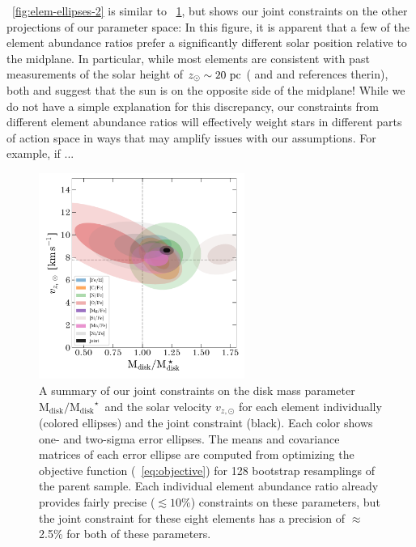 \documentclass[modern]{aastex63}
\newcommand{\mdisk}{\ensuremath{\mathrm{M}_\mathrm{disk}}}
\newcommand{\mratio}{\ensuremath{\mdisk / \mdisk^\star}}
\begin{document}
\figurename~\ref{fig:elem-ellipses-2} is similar to
\figurename~\ref{fig:elem-ellipses-1}, but shows our joint constraints on the
other projections of our parameter space:
In this figure, it is apparent that a few of the element abundance ratios prefer
a significantly different solar position relative to the midplane.
In particular, while most elements are consistent with past measurements of the
solar height of $z_\odot \sim 20~\mathrm{pc}$ (\citealt{Bennett:2019} and
\citealt{Bland-Hawthorn:2016} and references therin), both 
and  suggest that the sun is on the opposite side of the
midplane!
While we do not have a simple explanation for this discrepancy, our constraints
from different element abundance ratios will effectively weight stars in
different parts of action space in ways that may amplify issues with our
assumptions.
For example, if ...


\begin{figure}[!tp]
  \begin{mdframed}[style=figure]
  \begin{center}
  \includegraphics[width=0.6\textwidth]{M-vz-error-ellipses.pdf}
  \end{center}
  \caption{%
    A summary of our joint constraints on the disk mass parameter \mratio\ and
    the solar velocity $v_{z, \odot}$ for each element individually (colored
    ellipses) and the joint constraint (black).
    Each color shows one- and two-sigma error ellipses.
    The means and covariance matrices of each error ellipse are computed from
    optimizing the objective function (\equationname~\ref{eq:objective}) for 128
    bootstrap resamplings of the parent sample.
    Each individual element abundance ratio already provides fairly precise
    ($\lesssim10\%$) constraints on these parameters, but the joint constraint
    for these eight elements has a precision of $\approx$2.5\% for both of these
    parameters.
  \label{fig:elem-ellipses-1}
  }
  \end{mdframed}
\end{figure}
\end{document}
